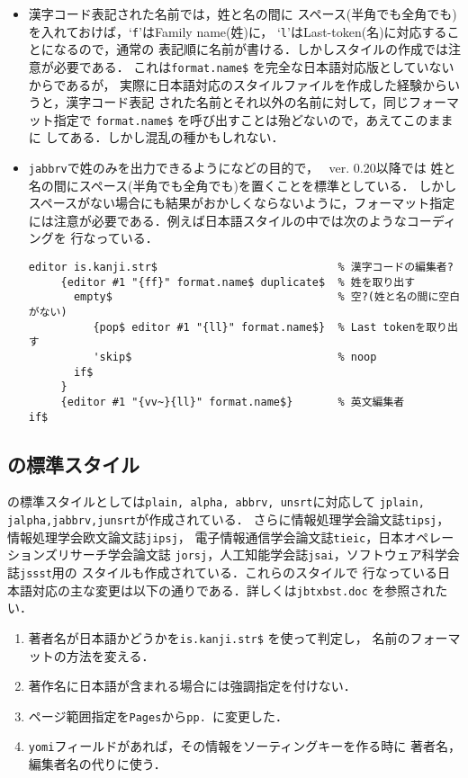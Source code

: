 \begin{itemize}
\item  漢字コード表記された名前では，姓と名の間に
スペース(半角でも全角でも)を入れておけば，`{\tt f}'はFamily name(姓)に，
`{\tt l}'はLast-token(名)に対応することになるので，通常の
表記順に名前が書ける．しかしスタイルの作成では注意が必要である．
これは{\tt format.name\$} を完全な日本語対応版としていないからであるが，
実際に日本語対応のスタイルファイルを作成した経験からいうと，漢字コード表記
された名前とそれ以外の名前に対して，同じフォーマット指定で
{\tt format.name\$} を呼び出すことは殆どないので，あえてこのままに
してある．しかし混乱の種かもしれない．

\item {\tt jabbrv}で姓のみを出力できるようになどの目的で，
\JBibTeX\ ver. 0.20以降では
姓と名の間にスペース(半角でも全角でも)を置くことを標準としている．
しかしスペースがない場合にも結果がおかしくならないように，フォーマット指定
には注意が必要である．例えば日本語スタイルの中では次のようなコーディングを
行なっている．

{\baselineskip=11pt
\begin{verbatim}
editor is.kanji.str$                            % 漢字コードの編集者?
     {editor #1 "{ff}" format.name$ duplicate$  % 姓を取り出す
       empty$                                   % 空?(姓と名の間に空白がない)
          {pop$ editor #1 "{ll}" format.name$}  % Last tokenを取り出す
          'skip$                                % noop
       if$
     }
     {editor #1 "{vv~}{ll}" format.name$}       % 英文編集者
if$
\end{verbatim}
}
\end{itemize}

\subsection{\JBibTeX の標準スタイル}

\JBibTeX の標準スタイルとしては{\tt plain, alpha, abbrv, unsrt}に対応して
{\tt jplain, jalpha,jabbrv,\linebreak junsrt}が作成されている．
さらに情報処理学会論文誌{\tt tipsj}，情報処理学会欧文論文誌{\tt jipsj}，
電子情報通信学会論文誌{\tt tieic}，日本オペレーションズリサーチ学会論文誌
{\tt jorsj}，人工知能学会誌{\tt jsai}，ソフトウェア科学会誌{\tt jssst}用の
スタイルも作成されている．これらのスタイルで
行なっている日本語対応の主な変更は以下の通りである．詳しくは{\tt jbtxbst.doc}
を参照されたい．

\begin{enumerate}
\item 著者名が日本語かどうかを{\tt is.kanji.str\$} を使って判定し，
名前のフォーマットの方法を変える．

\item 著作名に日本語が含まれる場合には強調指定を付けない．

\item ページ範囲指定を{\tt Pages}から{\tt pp.\ }に変更した．

\item {\tt yomi}フィールドがあれば，その情報をソーティングキーを作る時に
著者名，編集者名の代りに使う．
\end{enumerate}

\baselineskip=16pt



